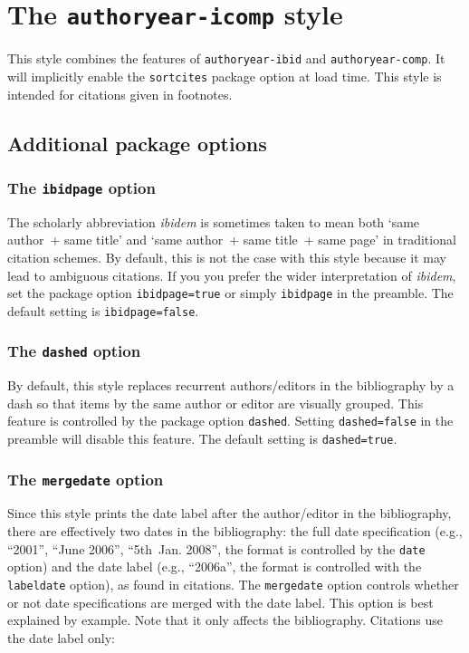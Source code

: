 \documentclass[a4paper]{article}
\begin{document}
\section*{The \texttt{authoryear-icomp} style}

This style combines the features of \texttt{authoryear-ibid} and
\texttt{authoryear-comp}. It will implicitly enable the
\texttt{sortcites} package option at load time. This style is
intended for citations given in footnotes.

\subsection*{Additional package options}

\subsubsection*{The \texttt{ibidpage} option}

The scholarly abbreviation \emph{ibidem} is sometimes taken to mean
both `same author~+ same title' and `same author~+ same title~+ same
page' in traditional citation schemes. By default, this is not the
case with this style because it may lead to ambiguous citations. If
you you prefer the wider interpretation of \emph{ibidem}, set the
package option \texttt{ibidpage=true} or simply \texttt{ibidpage} in
the preamble. The default setting is \texttt{ibidpage=false}.

\subsubsection*{The \texttt{dashed} option}

By default, this style replaces recurrent authors/editors in the
bibliography by a dash so that items by the same author or editor
are visually grouped. This feature is controlled by the package
option \texttt{dashed}. Setting \texttt{dashed=false} in the
preamble will disable this feature. The default setting is
\texttt{dashed=true}.

\subsubsection*{The \texttt{mergedate} option}

Since this style prints the date label after the author/editor in the
bibliography, there are effectively two dates in the bibliography:
the full date specification (e.g., \enquote{2001}, \enquote{June
2006}, \enquote{5th~Jan. 2008}, the format is controlled by the
\texttt{date} option) and the date label (e.g., \enquote{2006a},
the format is controlled with the \texttt{labeldate} option),
as found in citations. The \texttt{mergedate} option controls whether
or not date specifications are merged with the date label.
This option is best explained by example. Note that
it only affects the bibliography. Citations use the date label only:
\end{document}

